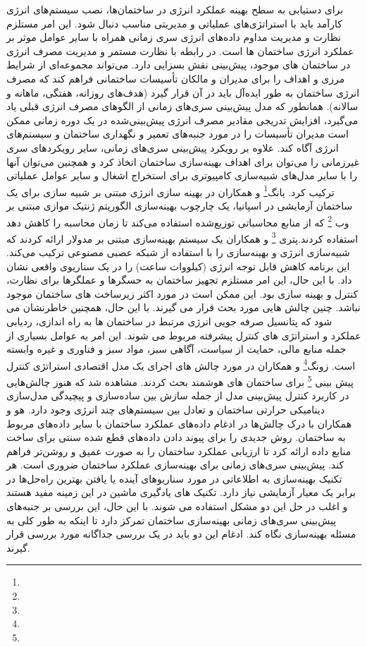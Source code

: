 برای دستیابی به سطح بهینه عملکرد انرژی در ساختمان‌ها، نصب سیستم‌های انرژی کارآمد باید با استراتژی‌های عملیاتی و مدیریتی مناسب دنبال شود. این امر مستلزم نظارت و مدیریت مداوم داده‌های انرژی سری زمانی همراه با سایر عوامل موثر بر عملکرد انرژی ساختمان ها است. در رابطه با نظارت مستمر و مدیریت مصرف انرژی در ساختمان های موجود، پیش‌بینی نقش بسزایی دارد. می‌تواند مجموعه‌ای از شرایط مرزی و اهداف را برای مدیران و مالکان تأسیسات ساختمانی فراهم کند که مصرف انرژی ساختمان به طور ایده‌آل باید در آن قرار گیرد (هدف‌های روزانه، هفتگی، ماهانه و سالانه). همانطور که مدل پیش‌بینی سری‌های زمانی از الگوهای مصرف انرژی قبلی یاد می‌گیرد، افزایش تدریجی مقادیر مصرف انرژی پیش‌بینی‌شده در یک دوره زمانی ممکن است مدیران تأسیسات را در مورد جنبه‌های تعمیر و نگهداری ساختمان و سیستم‌های انرژی آگاه کند. علاوه بر رویکرد پیش‌بینی سری‌های زمانی، سایر رویکردهای سری غیرزمانی را می‌توان برای اهداف بهینه‌سازی ساختمان اتخاذ کرد و همچنین می‌توان آنها را با سایر مدل‌های شبیه‌سازی کامپیوتری برای استخراج اشغال و سایر عوامل عملیاتی ترکیب کرد. یانگ\footnote{} و همکاران در بهینه سازی انرژی مبتنی بر شبیه سازی برای یک ساختمان آزمایشی در اسپانیا، یک چارچوب بهینه‌سازی الگوریتم ژنتیک موازی مبتنی بر وب \footnote{} که از منابع محاسباتی توزیع‌شده استفاده می‌کند تا زمان محاسبه را کاهش دهد استفاده کردند.پتری \footnote{} و همکاران یک سیستم بهینه‌سازی مبتنی بر مدولار ارائه کردند که شبیه‌سازی انرژی و بهینه‌سازی را با استفاده از شبکه عصبی مصنوعی ترکیب می‌کند. این برنامه کاهش قابل توجه انرژی (کیلووات ساعت) را در یک سناریوی واقعی نشان داد. با این حال، این امر مستلزم تجهیز ساختمان به حسگرها و عملگرها برای نظارت، کنترل و بهینه سازی بود. این ممکن است در مورد اکثر زیرساخت های ساختمان موجود نباشد. چنین چالش هایی مورد بحث قرار می گیرند. با این حال، همچنین خاطرنشان می شود که پتانسیل صرفه جویی انرژی مرتبط در ساختمان ها به راه اندازی، ردیابی عملکرد و استراتژی های کنترل پیشرفته مربوط می شوند. این امر به عوامل بسیاری از جمله منابع مالی، حمایت از سیاست، آگاهی سبز، مواد سبز و فناوری و غیره وابسته است. زونگ\footnote{} و همکاران در مورد چالش های اجرای یک مدل اقتصادی استراتژی کنترل پیش بینی \footnote{} برای ساختمان های هوشمند بحث کردند. مشاهده شد که هنوز چالش‌هایی در کاربرد کنترل پیش‌بینی مدل از جمله سازش بین ساده‌سازی و پیچیدگی مدل‌سازی دینامیکی حرارتی ساختمان و تعادل بین سیستم‌های چند انرژی وجود دارد. هو و همکاران با درک چالش‌ها در ادغام داده‌های عملکرد ساختمان با سایر داده‌های مربوط به ساختمان. روش جدیدی را برای پیوند دادن داده‌های قطع شده سنتی برای ساخت منابع داده ارائه کرد تا ارزیابی عملکرد ساختمان را به صورت عمیق و روشن‌تر فراهم کند. 
پیش‌بینی سری‌های زمانی برای بهینه‌سازی عملکرد ساختمان ضروری است. هر تکنیک بهینه‌سازی به اطلاعاتی در مورد سناریوهای آینده یا یافتن بهترین راه‌حل‌ها در برابر یک معیار آزمایشی نیاز دارد. تکنیک های یادگیری ماشین در این زمینه مفید هستند و اغلب در حل این دو مشکل استفاده می شوند. با این حال، این بررسی بر جنبه‌های پیش‌بینی سری‌های زمانی بهینه‌سازی ساختمان تمرکز دارد تا اینکه به طور کلی به مسئله بهینه‌سازی نگاه کند. ادغام این دو باید در یک بررسی جداگانه مورد بررسی قرار گیرند.



